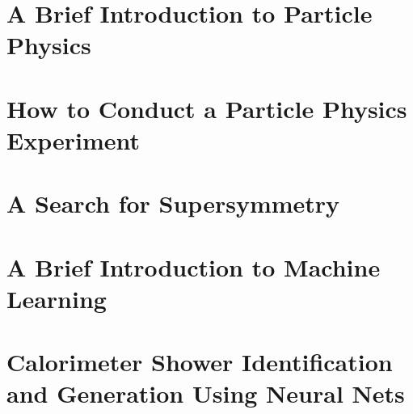 \documentclass[draftthesis,fancy,edeposit]{uiuc_thesis_template}
\begin{document}

\tableofcontents
\listoftables
\listoffigures

\mainmatter

\part{A Brief Introduction to Particle Physics}

\part{How to Conduct a Particle Physics Experiment}

\part{A Search for Supersymmetry}

\part{A Brief Introduction to Machine Learning}

\part{Calorimeter Shower Identification and Generation Using Neural Nets}
\end{document}
